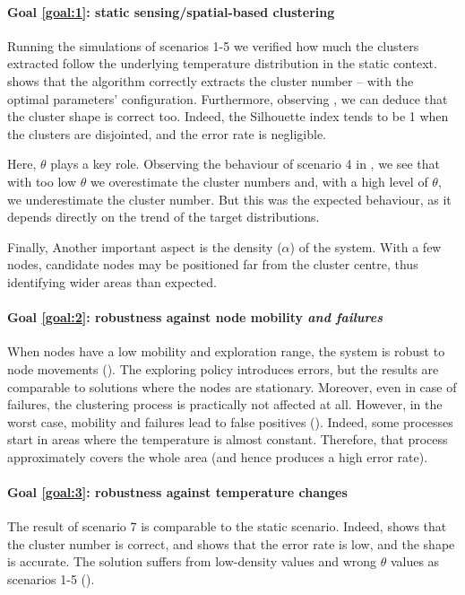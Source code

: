 \paragraph*{Goal \ref{goal:1}: static sensing/spatial-based clustering}
Running the simulations of scenarios 1-5 we verified how much the clusters extracted follow the underlying temperature distribution in the static context.
  shows that the algorithm correctly extracts the cluster number -- with the optimal parameters' configuration.
 Furthermore, observing , we can deduce that the cluster shape is correct too.
 Indeed, the Silhouette index tends to be 1 when the clusters are disjointed, and the error rate is negligible.

Here, $\theta$ plays a key role. Observing the behaviour of scenario 4 in ,
 we see that with too low $\theta$ we overestimate the cluster numbers and,
 with a high level of $\theta$, we underestimate the cluster number.
 But this was the expected behaviour, as it depends directly on the trend of the target distributions.

Finally, Another important aspect is the density ($\alpha$) of the system.
 With a few nodes, candidate nodes may be positioned far from the cluster centre, thus identifying wider areas than expected.
\paragraph*{Goal \ref{goal:2}: robustness against node mobility \emph{and failures}}
When nodes have a low mobility and exploration range, the system is robust to node movements ().
 The exploring policy introduces errors, but the results are comparable to solutions where the nodes are stationary.
Moreover, even in case of failures, the clustering process is practically not affected at all.
However, in the worst case, mobility and failures lead to false positives ().
 Indeed, some processes start in areas where the temperature is almost constant.
 Therefore, that process approximately covers the whole area (and hence produces a high error rate).
\paragraph*{Goal \ref{goal:3}: robustness against temperature changes}
The result of scenario 7 is comparable to the static scenario.
 Indeed,  shows that the cluster number is correct, and  shows that the error rate is low, and the shape is accurate.
 The solution suffers from low-density values and wrong $\theta$ values as scenarios 1-5 ().

